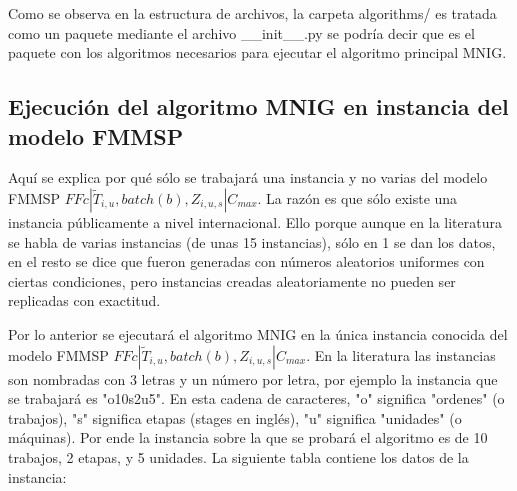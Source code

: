 \documentclass{article}
\def\notac_modelo{$FFc | \tilde{T}_{i, u}, batch(b), Z_{i, u, s} | C_{max}$}
\begin{document}
\vspace{\baselineskip}
Como se observa en la estructura de archivos, la carpeta algorithms/ es tratada como un paquete mediante el archivo \_\_init\_\_.py se podría decir que es el paquete con los algoritmos necesarios para ejecutar el algoritmo principal MNIG.

\subsection{Ejecución del algoritmo MNIG en instancia del modelo FMMSP}

Aquí se explica por qué sólo se trabajará una instancia y no varias del modelo FMMSP \notac_modelo. La razón es que sólo existe una instancia públicamente a nivel internacional. Ello porque aunque en la literatura se habla de varias instancias (de unas 15 instancias), sólo en 1 se dan los datos, en el resto se dice que fueron generadas con números aleatorios uniformes con ciertas condiciones, pero instancias creadas aleatoriamente no pueden ser replicadas con exactitud. \autocite{modFMMSP}

\vspace{\baselineskip}
Por lo anterior se ejecutará el algoritmo MNIG en la única instancia conocida del modelo FMMSP \notac_modelo. En la literatura las instancias son nombradas con 3 letras y un número por letra, por ejemplo la instancia que se trabajará es "o10s2u5". En esta cadena de caracteres, "o" significa "ordenes" (o trabajos), "s" significa etapas (stages en inglés), "u" significa "unidades" (o máquinas). Por ende la instancia sobre la que se probará el algoritmo es de 10 trabajos, 2 etapas, y 5 unidades. La siguiente tabla contiene los datos de la instancia: \autocite{modFMMSP}
\end{document}
